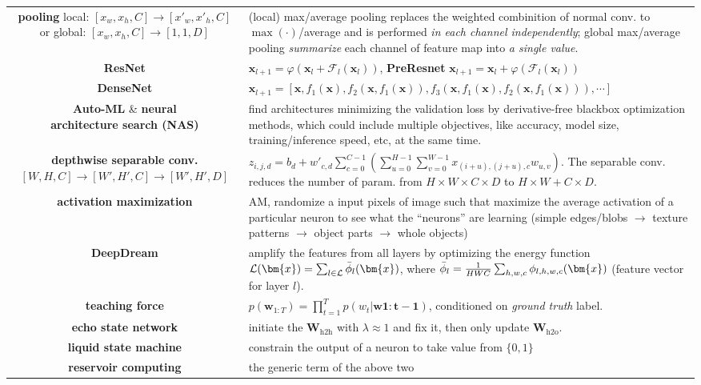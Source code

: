 \begin{table}[htpb]
{\begin{tabular}{cp{32em}}
        \makecell{\textbf{pooling} \\ local: {\color{blue}$[x_w,x_h,C]\to[x'_w,x'_h,C]$} \\ or global: {\color{blue}$[x_w,x_h,C]\to[1,1,D]$}} &
        (local) max/average pooling replaces the weighted combinition of normal conv. to $\max(\cdot)$/average and is performed \textit{in each channel independently};
        global max/average pooling \textit{summarize} each channel of feature map into \textit{a single value}. \\
        \textbf{ResNet} & $\bm{x}_{l+1} = \varphi(\bm{x}_l + \mathcal{F}_l(\bm{x}_l))$,
        \textbf{PreResnet} $\bm{x}_{l+1} = \bm{x}_l + \varphi(\mathcal{F}_l(\bm{x}_l))$  \\
        \textbf{DenseNet} & $\bm{x}_{l+1} = \left[\boxed{\bm{x}},\boxed{f_1(\bm{x})}, \boxed{f_2(\bm{x},f_1(\bm{x}))}, \boxed{f_3(\bm{x},f_1(\bm{x}),f_2(\bm{x},f_1(\bm{x})))},\cdots\right]$ \\
        \makecell{\textbf{Auto-ML} \& \textbf{neural} \\
        \textbf{architecture search (NAS)}} & 
        find architectures minimizing the validation loss by derivative-free blackbox optimization methods, 
        which could include multiple objectives, like accuracy, model size, training/inference speed, etc, at the same time. \\
        \makecell{\textbf{depthwise separable conv.} \\ {\color{blue}$[W,H,C]\to[W',H',C]\to[W',H',D]$}} & 
        $z_{i,j,d}=b_d+w'_{c,d}\sum_{c=0}^{C-1}\left(\sum_{u=0}^{H-1}\sum_{v=0}^{W-1}x_{(i+u),(j+u),c}w_{u,v}\right)$. 
        The separable conv. reduces the number of param. from $H\times W\times C\times D$ to $H\times W + C\times D$. \\
        \textbf{activation maximization} & AM, randomize a input pixels of image such that maximize the average activation of a particular neuron 
        to see what the ``neurons'' are learning (simple edges/blobs $\to$ texture patterns $\to$ object parts $\to$ whole objects) \\
        \textbf{DeepDream} & amplify the features from all layers by optimizing the energy function 
        $\mathcal{L}(\bm{x})=\sum_{l\in \mathcal{L}}\Bar{\phi}_l(\bm{x})$,
        where $\Bar{\phi}_l=\frac{1}{HWC}\sum_{h,w,c}\phi_{l,h,w,c}(\bm{x})$ (feature vector for layer $l$). \\
        \textbf{teaching force} & $p(\bm{w}_{1:T}) = \prod_{t=1}^T p(w_t|\bm{w1:t-1})$, conditioned on \textit{ground truth} label. \\
        \textbf{echo state network} & initiate the $\mathbf{W}_\text{h2h}$ with $\lambda\approx 1$ and fix it, then only update $\mathbf{W}_\text{h2o}$. \\
        \textbf{liquid state machine} & constrain the output of a neuron to take value from $\{0,1\}$ \\
        \textbf{reservoir computing} & the generic term of the above two \\
        \bottomrule
    \end{tabular}}
    \label{tab:nn4imgseq}
\end{table}

